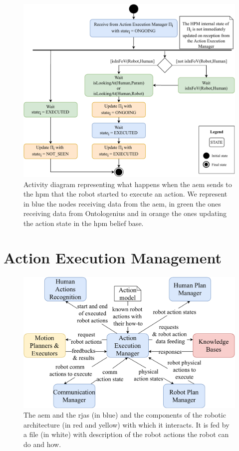 \documentclass[a4paper,11pt,twoside]{StyleThese}
\begin{document}
\begin{figure}[!ht]
	\includegraphics[width=\linewidth]{figures/chapter2/robot_action_hpm.pdf}
	\caption{Activity diagram representing what happens when the \acrfull{aem} sends to the \acrshort{hpm} that the robot started to execute an action. We represent in blue the nodes receiving data from the \acrshort{aem}, in green the ones receiving data from Ontologenius and in orange the ones updating the action state in the \acrshort{hpm} belief base.}
	\label{chap6:fig:robot_action_hpm}
\end{figure}

\clearpage

\section{Action Execution Management}\label{chap6:sec:aem}

\begin{figure}[!hbt]
	\centering
	\includegraphics[width=0.85\linewidth]{figures/chapter2/action_exe_manager_zoom.pdf}
	\caption{The \acrlong{aem} and the \acrshort{rja}s (in blue) and the components of the robotic architecture (in red and yellow) with which it interacts. It is fed by a file (in white) with description of the robot actions the robot can do and how.}
	\label{chap6:fig:action_exe_zoom}
\end{figure}
\end{document}
